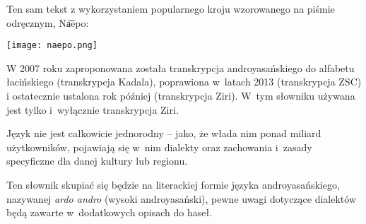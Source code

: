 \begin{spacing}{1.1}
\skipline

Ten sam tekst z wykorzystaniem popularnego kroju wzorowanego na piśmie
odręcznym, Na͞epo:

\begin{center}
    \texttt{[image: naepo.png]}
\end{center}

W 2007 roku zaproponowana została transkrypcja androyasańskiego do alfabetu 
łacińskiego (transkrypcja Kadala), poprawiona w~latach 2013 (transkrypcja 
ZSC) i ostatecznie ustalona rok później (transkrypcja Ziri). W~tym słowniku
używana jest tylko i~wyłącznie transkrypcja Ziri.

Język nie jest całkowicie jednorodny -- jako, że włada nim ponad miliard 
użytkowników, pojawiają się w~nim dialekty oraz zachowania i~zasady specyficzne 
dla danej kultury lub regionu. 

Ten słownik skupiać się będzie na literackiej formie języka androyasańskiego,
nazywanej \emph{ardo andro} (wysoki androyasański), pewne uwagi dotyczące
dialektów będą zawarte w~dodatkowych opisach do haseł.

\end{spacing}